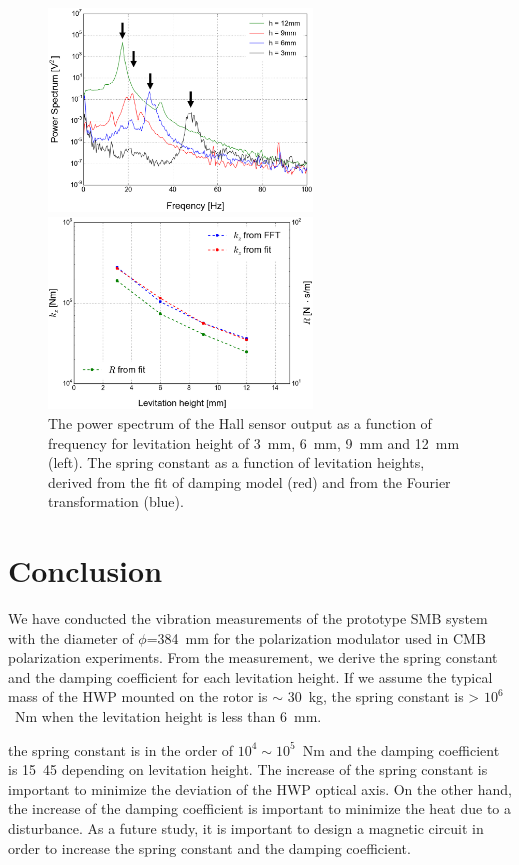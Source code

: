\documentclass[a4paper]{jpconf}
\begin{document}
\begin{figure}[htbp]
  \centering
  \begin{minipage}{0.45\hsize}
    \includegraphics[width=70mm]{vibration_fft_B.eps}
  \end{minipage}
  \begin{minipage}{0.45\hsize}
    \centering
    \includegraphics[width=70mm]{SpringConstant.eps}
  \end{minipage}
  \caption{The power spectrum of the Hall sensor output as a function of frequency for levitation height of 3~mm, 6~mm, 9~mm and 12~mm (left).
    The spring constant as a function of levitation heights, derived from the fit of damping model (red) and from the Fourier transformation (blue).}
  \label{fig:fft}
\end{figure}


\section*{Conclusion}
We have conducted the vibration measurements of the prototype SMB system with the diameter of $\phi$=384~mm for the polarization modulator used in CMB polarization experiments.
From the measurement, we derive the spring constant and the damping coefficient for each levitation height.
If we assume the typical mass of the HWP mounted on the rotor is $\sim$ 30~kg, the spring constant is > $10^{6}$~Nm when the levitation height is less than 6~mm.

the spring constant is in the order of $10^{4} \sim 10^{5}$~Nm and the damping coefficient is 15~45 depending on levitation height.
The increase of the spring constant is important to minimize the deviation of the HWP optical axis.
On the other hand, the increase of the damping coefficient is important to minimize the heat due to a disturbance.
As a future study, it is important to design a magnetic circuit in order to increase the spring constant and the damping coefficient.
\end{document}
